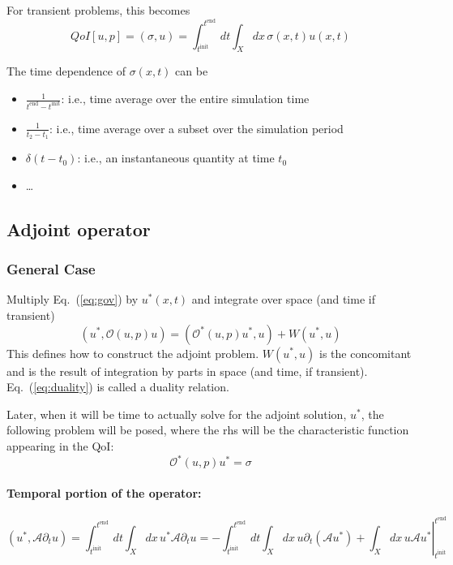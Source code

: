 \documentclass[11pt]{article}
\newcommand{\eqt}[1]{Eq.~(\ref{#1})}                     %
\newcommand{\be}{\begin{equation}}
\newcommand{\ee}{\end{equation}}
\renewcommand{\O}{\mathcal{O}}
\newcommand{\mc}[1]{\mathcal{#1}}
\newcommand{\us}{{u^\ast}}
\newcommand{\ti}{ {t^{\text{init}}} }
\newcommand{\te}{ {t^{\text{end }}} }
\begin{document}
For transient problems, this becomes
\be
QoI[u,p] = (\sigma, u) = \int_\ti ^\te dt \int_X  dx \, \sigma(x,t)u(x,t)
\ee

The time dependence of $\sigma(x,t)$ can be 
\begin{itemize}
\item $\frac{1}{t^{\text{end}}-t^{\text{init}}}$: i.e., time average over the entire simulation time 
\item $\frac{1}{t_2-t_1}$: i.e., time average over a subset over the simulation period
\item $\delta(t-t_0)$: i.e., an instantaneous quantity at time $t_0$
\item \ldots
\end{itemize}

\subsection{Adjoint operator}

\subsubsection{General Case}

Multiply \eqt{eq:gov} by $\us(x,t)$ and integrate over space (and time if transient)
\be
\label{eq:duality}
(\us,\O(u,p)u) = (\O^\ast(u,p)\us,u) + W(\us,u)
\ee
This defines how to construct the adjoint problem.
$W(\us,u)$ is the concomitant and is the result of integration by parts in space (and time, if transient). 
\eqt{eq:duality} is called a duality relation.


Later, when it will be time to actually solve for the adjoint solution, $\us$, the following problem will be
posed, where the rhs will be the characteristic function appearing in the QoI:
\be
\O^\ast(u,p)\us = \sigma
\ee
%

\paragraph{Temporal portion of the operator:}

\be
(\us,\mc{A} \partial_t u ) 
=  \int_\ti^\te dt \int_X dx \, \us \mc{A} \partial_t u
= -\int_\ti^\te dt \int_X dx \, u  \partial_t (\mc{A}\us) + 
\left. \int_X dx \, u \mc{A} \us \right|_\ti^\te 
\ee
\end{document}
